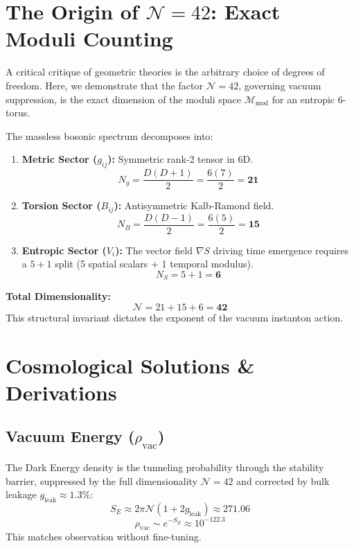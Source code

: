 \documentclass[aps,prd,twocolumn,superscriptaddress,showpacs,amsmath,amssymb,floatfix,nofootinbib]{revtex4-2}
\begin{document}
\section{The Origin of $\mathcal{N}=42$: Exact Moduli Counting}

A critical critique of geometric theories is the arbitrary choice of degrees of freedom. Here, we demonstrate that the factor $\mathcal{N}=42$, governing vacuum suppression, is the exact dimension of the moduli space $\mathcal{M}_{\text{mod}}$ for an entropic 6-torus.

The massless bosonic spectrum decomposes into:
\begin{enumerate}
    \item \textbf{Metric Sector ($g_{ij}$):} Symmetric rank-2 tensor in 6D.
    \begin{equation}
    N_g = \frac{D(D+1)}{2} = \frac{6(7)}{2} = \mathbf{21}
    \end{equation}
    \item \textbf{Torsion Sector ($B_{ij}$):} Antisymmetric Kalb-Ramond field.
    \begin{equation}
    N_B = \frac{D(D-1)}{2} = \frac{6(5)}{2} = \mathbf{15}
    \end{equation}
    \item \textbf{Entropic Sector ($V_i$):} The vector field $\nabla S$ driving time emergence requires a $5+1$ split (5 spatial scalars + 1 temporal modulus).
    \begin{equation}
    N_S = 5 + 1 = \mathbf{6}
    \end{equation}
\end{enumerate}

\textbf{Total Dimensionality:}
\begin{equation}
\mathcal{N} = 21 + 15 + 6 = \mathbf{42}
\end{equation}
This structural invariant dictates the exponent of the vacuum instanton action.

\section{Cosmological Solutions & Derivations}

\subsection{Vacuum Energy ($\rho_{\text{vac}}$)}
The Dark Energy density is the tunneling probability through the stability barrier, suppressed by the full dimensionality $\mathcal{N}=42$ and corrected by bulk leakage $g_{\text{leak}} \approx 1.3\%$:
\begin{equation}
S_E \approx 2\pi \mathcal{N} (1 + 2 g_{\text{leak}}) \approx 271.06
\end{equation}
\begin{equation}
\rho_{\text{vac}} \sim e^{-S_E} \approx 10^{-122.3}
\end{equation}
This matches observation without fine-tuning.
\end{document}
